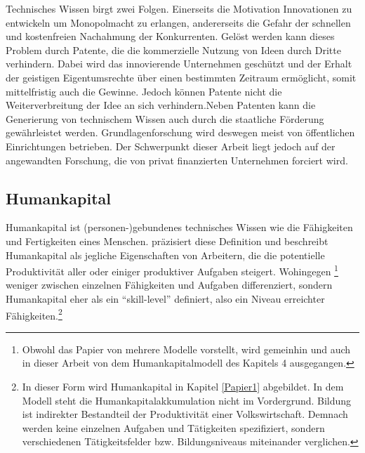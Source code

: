 Technisches Wissen birgt zwei Folgen. Einerseits die Motivation Innovationen zu entwickeln um Monopolmacht zu erlangen, andererseits die Gefahr der schnellen und kostenfreien Nachahmung der Konkurrenten. 
Gelöst werden kann dieses Problem durch Patente, die die kommerzielle Nutzung von Ideen durch Dritte verhindern. Dabei wird das innovierende Unternehmen geschützt und der Erhalt der geistigen Eigentumsrechte {\"u}ber einen bestimmten Zeitraum erm{\"o}glicht, somit mittelfristig auch die Gewinne. Jedoch können Patente nicht die Weiterverbreitung der Idee an sich verhindern.\newline Neben Patenten kann die Generierung von technischem Wissen auch durch die staatliche Förderung gewährleistet werden. Grundlagenforschung wird deswegen meist von {\"o}ffentlichen Einrichtungen betrieben. Der Schwerpunkt dieser Arbeit liegt jedoch auf der angewandten Forschung, die von privat finanzierten Unternehmen forciert wird.

\subsection{Humankapital}
Humankapital ist (personen-)gebundenes technisches Wissen wie die F{\"a}higkeiten und Fertigkeiten eines Menschen. \citet{Acemoglu.2009} präzisiert diese Definition und beschreibt Humankapital als jegliche Eigenschaften von Arbeitern, die die potentielle Produktivit{\"a}t aller oder einiger produktiver Aufgaben steigert. Wohingegen \citet{Lucas.1988}\footnote{Obwohl das Papier von \citet{Lucas.1988} mehrere Modelle vorstellt, wird gemeinhin und auch in dieser Arbeit von dem Humankapitalmodell des Kapitels 4 ausgegangen.} weniger zwischen einzelnen Fähigkeiten und Aufgaben differenziert, sondern Humankapital eher als ein "`skill-level"' definiert, also ein Niveau erreichter F{\"a}higkeiten.\footnote{In dieser Form wird Humankapital in Kapitel \ref{Papier1} abgebildet. In dem Modell steht die Humankapitalakkumulation nicht im Vordergrund. Bildung ist indirekter Bestandteil der Produktivität einer Volkswirtschaft. Demnach werden keine einzelnen Aufgaben und Tätigkeiten spezifiziert, sondern verschiedenen Tätigkeitsfelder bzw. Bildungsniveaus miteinander verglichen.}\\


